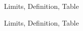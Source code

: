 \begin{tagblock}{Limits, Definition, Table}
\begin{question}
\begin{enumerate}
\end{enumerate}
	
	
\begin{tags}
	    Limits, Definition, Table
\end{tags}
	
\begin{diary}
	    
\end{diary}
	
\begin{solution}
	  
\end{solution}
	
\end{question}

\end{tagblock}



